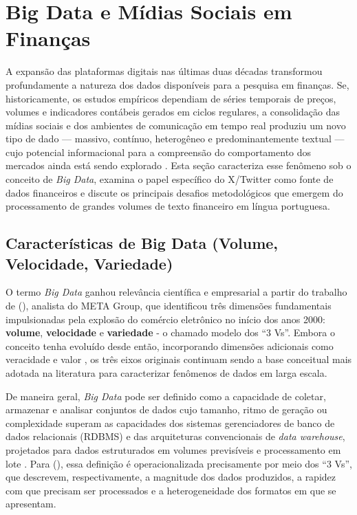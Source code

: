 \section{Big Data e Mídias Sociais em Finanças}
\label{sec:big_data_midias_sociais}

A expansão das plataformas digitais nas últimas duas décadas transformou profundamente a natureza dos dados disponíveis para a pesquisa em finanças. Se, historicamente, os estudos empíricos dependiam de séries temporais de preços, volumes e indicadores contábeis gerados em ciclos regulares, a consolidação das mídias sociais e dos ambientes de comunicação em tempo real produziu um novo tipo de dado --- massivo, contínuo, heterogêneo e predominantemente textual --- cujo potencial informacional para a compreensão do comportamento dos mercados ainda está sendo explorado \cite{kearney2014,mayer2013}. Esta seção caracteriza esse fenômeno sob o conceito de \textit{Big Data}, examina o papel específico do X/Twitter como fonte de dados financeiros e discute os principais desafios metodológicos que emergem do processamento de grandes volumes de texto financeiro em língua portuguesa.


\subsection{Características de Big Data (Volume, Velocidade, Variedade)}
\label{subsec:big_data_caracteristicas}

O termo \textit{Big Data} ganhou relevância científica e empresarial a partir do trabalho de \citeauthor{laney2001} (\citeyear{laney2001}), analista do META Group, que identificou três dimensões fundamentais impulsionadas pela explosão do comércio eletrônico no início dos anos 2000: \textbf{volume}, \textbf{velocidade} e \textbf{variedade} - o chamado modelo dos ``3 Vs''. Embora o conceito tenha evoluído desde então, incorporando dimensões adicionais como veracidade e valor \cite{mayer2013,chen2014bigdata}, os três eixos originais continuam sendo a base conceitual mais adotada na literatura para caracterizar fenômenos de dados em larga escala.

De maneira geral, \textit{Big Data} pode ser definido como a capacidade de coletar, armazenar e analisar conjuntos de dados cujo tamanho, ritmo de geração ou complexidade superam as capacidades dos sistemas gerenciadores de banco de dados relacionais (RDBMS) e das arquiteturas convencionais de \textit{data warehouse}, projetados para dados estruturados em volumes previsíveis e processamento em lote \cite{mayer2013,chen2014bigdata}. Para \citeauthor{chen2014bigdata} (\citeyear{chen2014bigdata}), essa definição é operacionalizada precisamente por meio dos ``3 Vs'', que descrevem, respectivamente, a magnitude dos dados produzidos, a rapidez com que precisam ser processados e a heterogeneidade dos formatos em que se apresentam.

